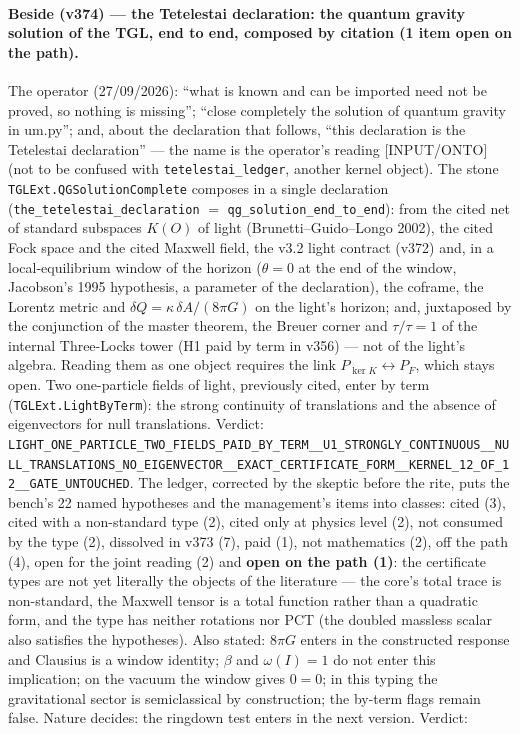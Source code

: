 \documentclass[11pt]{article}
\theoremstyle{definition}\newtheorem{deriv}{Derivation}
\begin{document}
\paragraph*{Beside (v374) --- the Tetelestai declaration: the quantum gravity solution of the TGL, end to end, composed by citation (1 item open on the path).} The operator (27/09/2026): ``what is known and can be imported need not be proved, so nothing is missing''; ``close completely the solution of quantum gravity in um.py''; and, about the declaration that follows, ``this declaration is the Tetelestai declaration'' --- the name is the operator's reading [INPUT/ONTO] (not to be confused with \texttt{tetelestai\_ledger}, another kernel object). The stone \texttt{TGLExt.QGSolutionComplete} composes in a single declaration (\texttt{the\_tetelestai\_declaration} $=$ \texttt{qg\_solution\_end\_to\_end}): from the cited net of standard subspaces $K(O)$ of light (Brunetti--Guido--Longo 2002), the cited Fock space and the cited Maxwell field, the v3.2 light contract (v372) and, in a local-equilibrium window of the horizon ($\theta=0$ at the end of the window, Jacobson's 1995 hypothesis, a parameter of the declaration), the coframe, the Lorentz metric and $\delta Q=\kappa\,\delta A/(8\pi G)$ on the light's horizon; and, juxtaposed by the conjunction of the master theorem, the Breuer corner and $\tau/\tau=1$ of the internal Three-Locks tower (H1 paid by term in v356) --- not of the light's algebra. Reading them as one object requires the link $P_{\ker K}\leftrightarrow P_F$, which stays open. Two one-particle fields of light, previously cited, enter by term (\texttt{TGLExt.LightByTerm}): the strong continuity of translations and the absence of eigenvectors for null translations. Verdict: \texttt{LIGHT\_ONE\_PARTICLE\_TWO\_FIELDS\_PAID\_BY\_TERM\_\_U1\_STRONGLY\_CONTINUOUS\_\_NULL\_TRANSLATIONS\_NO\_EIGENVECTOR\_\_EXACT\_CERTIFICATE\_FORM\_\_KERNEL\_12\_OF\_12\_\_GATE\_UNTOUCHED}. The ledger, corrected by the skeptic before the rite, puts the bench's 22 named hypotheses and the management's items into classes: cited (3), cited with a non-standard type (2), cited only at physics level (2), not consumed by the type (2), dissolved in v373 (7), paid (1), not mathematics (2), off the path (4), open for the joint reading (2) and \textbf{open on the path (1)}: the certificate types are not yet literally the objects of the literature --- the core's total trace is non-standard, the Maxwell tensor is a total function rather than a quadratic form, and the type has neither rotations nor PCT (the doubled massless scalar also satisfies the hypotheses). Also stated: $8\pi G$ enters in the constructed response and Clausius is a window identity; $\beta$ and $\omega(I)=1$ do not enter this implication; on the vacuum the window gives $0=0$; in this typing the gravitational sector is semiclassical by construction; the by-term flags remain false. Nature decides: the ringdown test enters in the next version. Verdict: 
\end{document}
